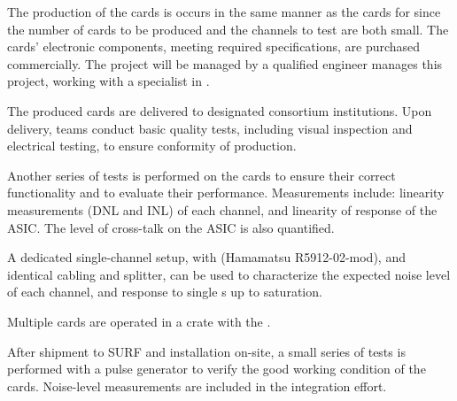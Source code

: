 The production of the   cards is %
occurs in the same manner as the cards for  since the number of cards to be produced and the channels to test are both small. The cards' electronic components, meeting required specifications, are purchased commercially. %
The project will be managed by a qualified engineer manages this project, working with a specialist in .

The produced cards are %
delivered to %
designated consortium institutions. %
Upon delivery, teams conduct basic quality tests, including visual inspection and electrical testing, to ensure conformity of production.

Another series of tests is performed on %
the cards to ensure their correct functionality and to evaluate their performance. Measurements include: linearity measurements (DNL and INL) of each  channel, and %
linearity of response of the ASIC. The level of cross-talk on the ASIC %
is also quantified.

A dedicated single-channel setup, with  (Hamamatsu R5912-02-mod), and identical cabling and splitter, can be used to characterize the expected noise level of each channel, and response to single \phel{}s up to saturation. 

Multiple cards are operated in a  crate with the %
.

After %
shipment to SURF and installation on-site, a small series of tests is performed with a pulse generator to verify the good working condition of the cards. Noise-level measurements are %
included in the integration effort.




